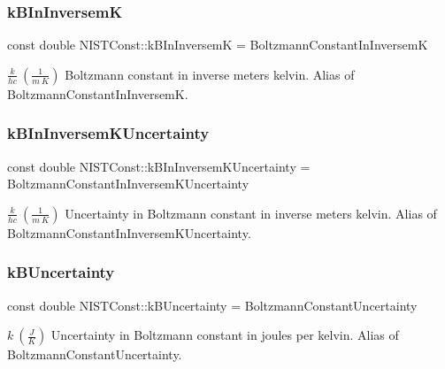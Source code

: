 \subsubsection{\texorpdfstring{k\+B\+In\+InversemK}{kBInInversemK}}
{\footnotesize\ttfamily const double N\+I\+S\+T\+Const\+::k\+B\+In\+InversemK = Boltzmann\+Constant\+In\+InversemK}

$\frac{k}{h c} \ (\frac{1}{m\ K})$ Boltzmann constant in inverse meters kelvin. Alias of Boltzmann\+Constant\+In\+InversemK. \mbox{\label{group___boltzmann_constant_gafb5daa855b569ec25364ad61ecea9b2a}} 
\subsubsection{\texorpdfstring{k\+B\+In\+Inversem\+K\+Uncertainty}{kBInInversemKUncertainty}}
{\footnotesize\ttfamily const double N\+I\+S\+T\+Const\+::k\+B\+In\+Inversem\+K\+Uncertainty = Boltzmann\+Constant\+In\+Inversem\+K\+Uncertainty}

$\frac{k}{h c} \ (\frac{1}{m\ K})$ Uncertainty in Boltzmann constant in inverse meters kelvin. Alias of Boltzmann\+Constant\+In\+Inversem\+K\+Uncertainty. \mbox{\label{group___boltzmann_constant_ga60fef44440e26486ae70903ff601a8e5}} 
\subsubsection{\texorpdfstring{k\+B\+Uncertainty}{kBUncertainty}}
{\footnotesize\ttfamily const double N\+I\+S\+T\+Const\+::k\+B\+Uncertainty = Boltzmann\+Constant\+Uncertainty}

$k \ (\frac{J}{K})$ Uncertainty in Boltzmann constant in joules per kelvin. Alias of Boltzmann\+Constant\+Uncertainty. 